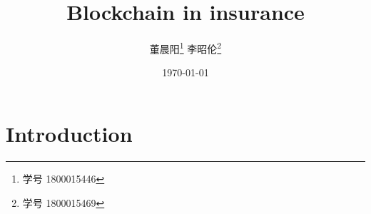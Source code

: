 \documentclass{article}
\title{Blockchain in insurance}
\author{
    董晨阳\thanks{学号 1800015446}
    李昭伦\thanks{学号 1800015469}
}
\date{\today}
\begin{document}
\maketitle
\tableofcontents
\clearpage

\section{Introduction}
\appendix
\printbibliography
\end{document}
